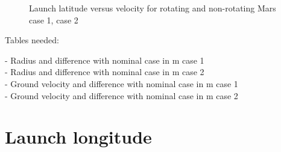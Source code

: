 \begin{figure}[H]
\centering
{} 
\caption{Launch latitude versus velocity for rotating and non-rotating Mars \protect{} case 1,  \protect{} case 2 } 
\label{fig:launchLatitudeVsVelocityCase1combined} 
\end{figure}

Tables needed:

- Radius and difference with nominal case in m case 1 \\
- Radius and difference with nominal case in m case 2 \\
- Ground velocity and difference with nominal case in m case 1 \\
- Ground velocity and difference with nominal case in m case 2 \\
 


\section{Launch longitude}
\label{sec:launchLongitude}

